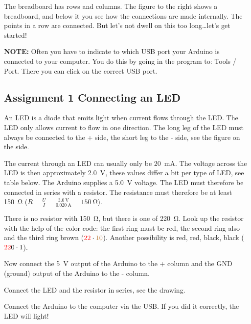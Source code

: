 \documentclass{arduino}
\begin{document}
The breadboard has rows and columns. The figure to the right shows a breadboard, and below it you see how the connections are made internally. The points in a row are connected. But let's not dwell on this too long\dots let's get started!

\textbf{NOTE:} Often you have to indicate to which USB port your Arduino is connected to your computer. You do this by going in the program to: Tools / Port. There you can click on the correct USB port.

\newpage

\subsection{Assignment 1 Connecting an LED}

An LED is a diode that emits light when current flows through the LED. The LED only allows current to flow in one direction. The long leg of the LED must always be connected to the + side, the short leg to the - side, see the figure on the side.

The current through an LED can usually only be \SI{20}{\milli\ampere}. The voltage across the LED is then approximately \SI{2.0}{\volt}, these values ​​differ a bit per type of LED, see table below. The Arduino supplies a \SI{5.0}{\volt} voltage. The LED must therefore be connected in series with a resistor. The resistance must therefore be at least \SI{150}{\ohm} ($R = \frac{U}{I} = \frac{\SI{3.0}{\volt}}{\SI{0.020}{\ampere}} = \SI{150}{\ohm}$).


\begin{alphalist}
\item There is no resistor with \SI{150}{\ohm}, but there is one of \SI{220}{\ohm}. Look up the resistor with the help of the color code: the first ring must be red, the second ring also and the third ring brown ($\textcolor{red}{2}\textcolor{red}{2} \cdot \textcolor{brown}{10}$). Another possibility is red, red, black, black ($\textcolor{red}{2}\textcolor{red}{2}\textcolor{black}{0} \cdot \textcolor{black}{1}$).

\item Now connect the \SI{5}{\volt} output of the Arduino to the + column and the GND (ground) output of the Arduino to the - column.

\item Connect the LED and the resistor in series, see the drawing.

\item Connect the Arduino to the computer via the USB. If you did it correctly, the LED will light!
\end{alphalist}
\end{document}
